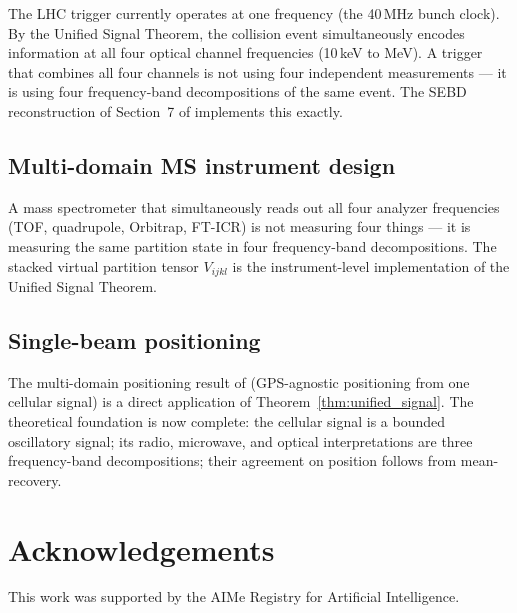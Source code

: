\documentclass[twocolumn,10pt,a4paper]{article}
\theoremstyle{thmstyle}
\theoremstyle{definition}
\theoremstyle{remark}
\begin{document}
The LHC trigger currently operates at one frequency (the 40\,MHz bunch
clock).  By the Unified Signal Theorem, the collision event simultaneously
encodes information at all four optical channel frequencies (10\,keV to MeV).
A trigger that combines all four channels is not using four independent
measurements --- it is using four frequency-band decompositions of the same
event.  The SEBD reconstruction of Section~7 of \citet{companion:extensor}
implements this exactly.

\subsection{Multi-domain MS instrument design}

A mass spectrometer that simultaneously reads out all four analyzer
frequencies (TOF, quadrupole, Orbitrap, FT-ICR) is not measuring four
things --- it is measuring the same partition state in four frequency-band
decompositions.  The stacked virtual partition tensor
$V_{ijkl}$ \citep{companion:tensor} is the instrument-level implementation
of the Unified Signal Theorem.

\subsection{Single-beam positioning}

The multi-domain positioning result of \citet{companion:signal_source}
(GPS-agnostic positioning from one cellular signal) is a direct application
of Theorem~\ref{thm:unified_signal}.  The theoretical foundation is now
complete: the cellular signal is a bounded oscillatory signal; its radio,
microwave, and optical interpretations are three frequency-band decompositions;
their agreement on position follows from mean-recovery.

\section*{Acknowledgements}
This work was supported by the AIMe Registry for Artificial Intelligence.



\end{document}
